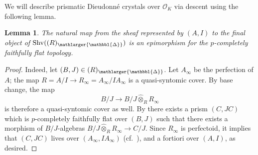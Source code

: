 \documentclass{amsart}
\newcommand{\prism}{{\mathlarger{\mathbbl{\Delta}}}}
\theoremstyle{plain}
\newtheorem{lemma}[theorem]{Lemma}
\theoremstyle{definition}
\begin{document}
We will describe prismatic Dieudonn\'e crystals over $\mathcal{O}_K$ via descent using the following lemma. 
\begin{lemma}
  \label{sec:comp-over-mathc-lemma-breuil-kisin-prism-covers-final-object}
The natural map from the sheaf represented by $(A,I)$ to the final object of $\mathrm{Shv}((R)_{\prism})$ is an epimorphism for the $p$-completely faithfully flat topology.
\end{lemma}
\begin{proof}
Indeed, let $(B,J) \in (R)_{\prism}$. Let $A_{\infty}$ be the perfection of $A$; the map $R=A/I \to R_{\infty}=A_{\infty}/IA_{\infty}$ is a quasi-syntomic cover. By base change, the map
\[ B/J \to B/J \hat{\otimes}_R R_{\infty} \]
is therefore a quasi-syntomic cover as well. By  there exists a prism $(C,JC)$ which is $p$-completely faithfully flat over $(B,J)$ such that there exists a morphism of $B/J$-algebras $B/J \hat{\otimes}_R R_{\infty}\to C/J$. Since $R_{\infty}$ is perfectoid, it implies that $(C,JC)$ lives over $(A_{\infty},IA_{\infty})$ (cf.\ ), and a fortiori over $(A,I)$, as desired.
\end{proof}
\end{document}
